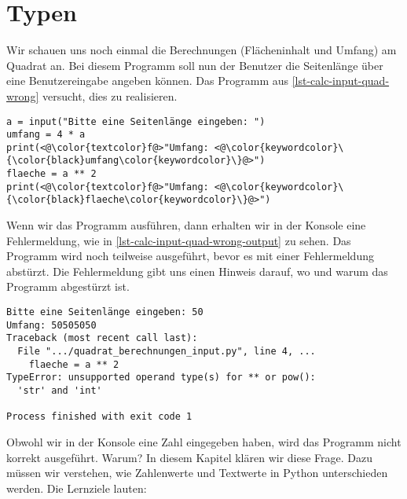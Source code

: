 
\toggletrue{image}
\toggletrue{imagehover}

\chapter{Typen}
\label{chapter-typen}

Wir schauen uns noch einmal die Berechnungen (Flächeninhalt und Umfang) am Quadrat an. Bei diesem Programm soll nun der Benutzer die Seitenlänge über eine Benutzereingabe angeben können. Das Programm aus \autoref{lst-calc-input-quad-wrong} versucht, dies zu realisieren.

\begin{lstlisting}[language={python3}, caption={Geometrische Berechnungen am Quadrat.}, label=lst-calc-input-quad-wrong]
a = input("Bitte eine Seitenlänge eingeben: ")
umfang = 4 * a
print(<@\color{textcolor}f@>"Umfang: <@\color{keywordcolor}\{\color{black}umfang\color{keywordcolor}\}@>")
flaeche = a ** 2
print(<@\color{textcolor}f@>"Umfang: <@\color{keywordcolor}\{\color{black}flaeche\color{keywordcolor}\}@>")
\end{lstlisting}

Wenn wir das Programm ausführen, dann erhalten wir in der Konsole eine Fehlermeldung, wie in \autoref{lst-calc-input-quad-wrong-output} zu sehen. Das Programm wird noch teilweise ausgeführt, bevor es mit einer Fehlermeldung abstürzt. Die Fehlermeldung gibt uns einen Hinweis darauf, wo und warum das Programm abgestürzt ist.

\begin{lstlisting}[language=output, label={lst-calc-input-quad-wrong-output}, caption={Konsolenausgabe des fehlerhaften Programms.}]
Bitte eine Seitenlänge eingeben: 50
Umfang: 50505050
Traceback (most recent call last):
  File ".../quadrat_berechnungen_input.py", line 4, ...
    flaeche = a ** 2
TypeError: unsupported operand type(s) for ** or pow(): 
  'str' and 'int'

Process finished with exit code 1
\end{lstlisting}

Obwohl wir in der Konsole eine Zahl eingegeben haben, wird das Programm nicht korrekt ausgeführt. Warum? In diesem Kapitel klären wir diese Frage. Dazu müssen wir verstehen, wie Zahlenwerte und Textwerte in Python unterschieden werden. Die Lernziele lauten:


